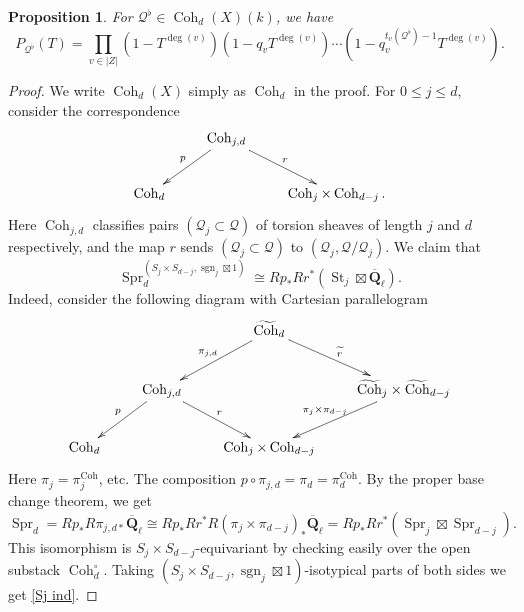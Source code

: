 \documentclass[reqno]{amsart}
\numberwithin{equation}{section}
\newcommand{\wt}[1]{\widetilde{#1}}
\newcommand{\Q}{\mathbf{Q}}
\newcommand{\sgn}{\operatorname{sgn}}
\DeclareMathOperator{\Coh}{Coh}
\DeclareMathOperator{\St}{St}
\DeclareMathOperator{\Spr}{Spr}
\newcommand{\bt}{\boxtimes}
\newcommand{\Qlbar}{\overline{\Q}_\ell}
\renewcommand\c{\circ}
\newcommand\cQ{\mathcal{Q}}
\newtheorem{prop}[thm]{Proposition}
\theoremstyle{remark}
\numberwithin{equation}{section}
\begin{document}
\begin{prop}\label{p:PQ Coh trace} For $\cQ^{\flat}\in \Coh_{d}(X)(k)$, we have
\begin{equation*}
P_{\cQ^{\flat}}(T)=\prod_{v\in |Z|}(1-T^{\deg(v)})(1-q_{v}T^{\deg(v)})\cdots (1-q_{v}^{t_{v}(\cQ^{\flat})-1}T^{\deg(v)}).
\end{equation*}
\end{prop}
\begin{proof} We write $\Coh_{d}(X)$ simply as $\Coh_{d}$ in the proof. For $0\le j\le d$, consider the correspondence
\begin{equation*}
\xymatrix{ & \Coh_{j,d}\ar[dl]_{p}\ar[dr]^{r}\\
\Coh_{d} && \Coh_{j}\times \Coh_{d-j}.}
\end{equation*}
Here $\Coh_{j,d}$ classifies pairs $(\cQ_{j}\subset \cQ)$ of torsion sheaves of length $j$ and $d$ respectively, and the map $r$ sends $(\cQ_{j}\subset \cQ)$ to $(\cQ_{j}, \cQ/\cQ_j)$. We claim that
\begin{equation}\label{Sj ind}
\Spr_{d}^{(S_{j}\times S_{d-j}, \sgn_{j}\bt1)}\cong Rp_{*}Rr^{*}(\St_{j}\bt\Qlbar).
\end{equation}
Indeed, consider the following diagram with Cartesian parallelogram
\begin{equation*}
\xymatrix{ & & \wt\Coh_{d}\ar[dl]_{\pi_{j,d}}\ar[dr]^{\wt r}\\
& \Coh_{j,d}\ar[dl]_{p}\ar[dr]^{r} & & \wt\Coh_{j}\times\wt\Coh_{d-j}\ar[dl]_{\pi_{j}\times\pi_{d-j}}\\
\Coh_{d} && \Coh_{j}\times \Coh_{d-j}
}
\end{equation*}
Here $\pi_{j}=\pi_{j}^{\Coh}$, etc. The composition $p\c \pi_{j,d}=\pi_{d}=\pi^{\Coh}_{d}$. By the proper base change theorem, we get
\begin{equation*}
\Spr_{d}=Rp_{*}R\pi_{j,d*}\Qlbar\cong Rp_{*}Rr^{*}R(\pi_{j}\times\pi_{d-j})_{*}\Qlbar=Rp_{*}Rr^{*}(\Spr_{j}\bt\Spr_{d-j}).
\end{equation*}
This isomorphism is $S_{j}\times S_{d-j}$-equivariant by checking easily over the open substack $\Coh_{d}^{\c}$. Taking $(S_{j}\times S_{d-j},\sgn_{j}\bt1)$-isotypical parts of both sides we get \eqref{Sj ind}.


\end{proof}
\end{document}
